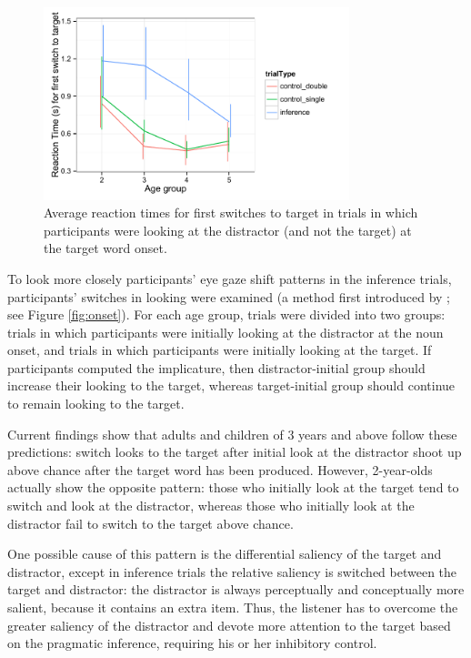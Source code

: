 \documentclass[10pt,letterpaper]{article}
\begin{document}
\begin{figure}
\begin{center} 
\includegraphics[width=3.5in]{figures/150116-0-rt_age.pdf}
\caption{\label{fig:rt} Average reaction times for first switches to target in trials in which participants were looking at the distractor (and not the target) at the target word onset.}
\end{center} 
\end{figure}

To look more closely participants' eye gaze shift patterns in the inference trials, participants' switches in looking were examined (a method first introduced by ; see Figure \ref{fig:onset}).  For each age group, trials were divided into two groups: trials in which participants were initially looking at the distractor at the noun onset, and trials in which participants were initially looking at the target.  If participants computed the implicature, then distractor-initial group should increase their looking to the target, whereas target-initial group should continue to remain looking to the target. 

Current findings show that adults and children of 3 years and above follow these predictions: switch looks to the target after initial look at the distractor shoot up above chance after the target word has been produced. However, 2-year-olds actually show the opposite pattern: those who initially look at the target tend to switch and look at the distractor, whereas those who initially look at the distractor fail to switch to the target above chance. 

One possible cause of this pattern is the differential saliency of the target and distractor, except in inference trials the relative saliency is switched between the target and distractor: the distractor is always perceptually and conceptually more salient, because it contains an extra item. Thus, the listener has to overcome the greater saliency of the distractor and devote more attention to the target based on the pragmatic inference, requiring his or her inhibitory control. 
\end{document}
